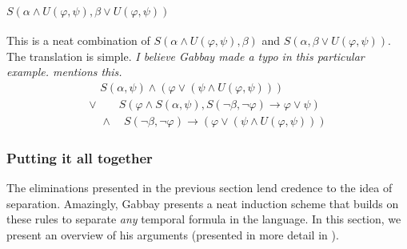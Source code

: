 \documentclass[a4paper,UKenglish,cleveref, autoref, thm-restate]{lipics-v2021}
\begin{document}
\paragraph*{$S(\alpha \land U(\varphi,\psi), \beta \lor U(\varphi, \psi))$}
This is a neat combination of $S(\alpha \land U(\varphi, \psi), \beta)$ and $S(\alpha, \beta \lor U(\varphi, \psi))$. The translation is simple. \textit{I believe Gabbay made a typo in this particular example. \cite{xpathComplete} mentions this.}
\begin{equation*}
    \begin{aligned}
        \quad S(\alpha, \psi) \land (\varphi \lor (\psi \land U(\varphi, \psi))) \\
        \lor \quad \quad S(\varphi \land S(\alpha, \psi), S(\lnot \beta, \lnot \varphi) \to \varphi \lor \psi)\\
        \quad \land \quad S(\lnot \beta, \lnot \varphi) \to (\varphi \lor (\psi \land U(\varphi, \psi)))
    \end{aligned}
\end{equation*}

\subsubsection{Putting it all together}

The eliminations presented in the previous section lend credence to the idea of separation. Amazingly, Gabbay presents a neat induction scheme that builds on these rules to separate \textit{any} temporal formula in the language. In this section, we present an overview of his arguments (presented in more detail in \cite{gabbay1994}).
\end{document}
